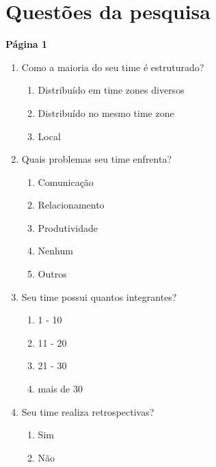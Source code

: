 \section{Questões da pesquisa}
\label{app:resultados}

\textbf{Página 1}
\begin{enumerate}
	\item Como a maioria do seu time é estruturado?
	\begin{enumerate}
		\item Distribuído em time zones diversos
		\item Distribuído no mesmo time zone
		\item Local
	\end{enumerate}
	\item Quais problemas seu time enfrenta? 
	\begin{enumerate}
		\item Comunicação 
		\item Relacionamento 
		\item Produtividade 
		\item Nenhum 
		\item Outros 
	\end{enumerate}
	\item Seu time possui quantos integrantes? 
	\begin{enumerate}
		\item 1 - 10 
		\item 11 - 20 
		\item 21 - 30 
		\item mais de 30 
	\end{enumerate}
	\item Seu time realiza retrospectivas? 
	\begin{enumerate}
		\item Sim 
		\item Não 
	\end{enumerate}
\end{enumerate}

